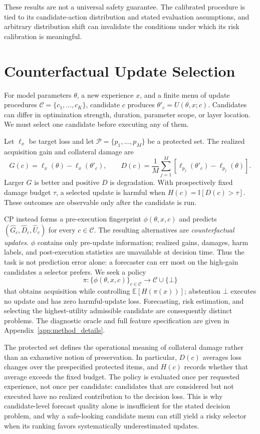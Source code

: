 \documentclass{article} %
\begin{document}
These results are not a universal safety guarantee. The calibrated procedure
is tied to its candidate-action distribution and stated evaluation
assumptions, and arbitrary distribution shift can invalidate the conditions
under which its risk calibration is meaningful.

\section{Counterfactual Update Selection}
\label{sec:problem}

For model parameters $\theta$, a new experience $x$, and a finite menu of
update procedures $\mathcal{C}=\{c_1,\ldots,c_K\}$, candidate $c$ produces
$\theta'_c=U(\theta,x;c)$. Candidates can differ in optimization strength,
duration, parameter scope, or layer location. We must select one candidate
before executing any of them.

Let $\ell_x$ be target loss and let $\mathcal P=\{p_1,\ldots,p_M\}$ be a
protected set. The realized acquisition gain and collateral damage are
\[
G(c)=\ell_x(\theta)-\ell_x(\theta'_c),\qquad
D(c)=\frac1M\sum_{j=1}^M[\ell_{p_j}(\theta'_c)-\ell_{p_j}(\theta)].
\]
Larger $G$ is better and positive $D$ is degradation. With prospectively fixed
damage budget $\tau$, a selected update is harmful when
$H(c)=\mathbb I[D(c)>\tau]$. These outcomes are observable only after the
candidate is run.

CP instead forms a pre-execution fingerprint $\phi(\theta,x,c)$ and predicts
$(\widehat G_c,\widehat D_c,\widehat U_c)$ for every $c\in\mathcal C$.
The resulting alternatives are \emph{counterfactual updates}. $\phi$ contains
only pre-update information; realized gains, damages, harm labels, and
post-execution statistics are unavailable at decision time. Thus the task is
not prediction error alone: a forecaster can err most on the high-gain
candidates a selector prefers. We seek a policy
\[
\pi:\{\phi(\theta,x,c)\}_{c\in\mathcal C}\to\mathcal C\cup\{\bot\}
\]
that obtains acquisition while controlling $\mathbb E[H(\pi(x))]$;
abstention $\bot$ executes no update and has zero harmful-update loss.
Forecasting, risk estimation, and selecting the highest-utility admissible
candidate are consequently distinct problems. The diagnostic oracle and full
feature specification are given in Appendix~\ref{app:method_details}.

The protected set defines the operational meaning of collateral damage rather
than an exhaustive notion of preservation. In particular, $D(c)$ averages loss
changes over the prespecified protected items, and $H(c)$ records whether that
average exceeds the fixed budget. The policy is evaluated once per requested
experience, not once per candidate: candidates that are considered but not
executed have no realized contribution to the decision loss. This is why
candidate-level forecast quality alone is insufficient for the stated
decision problem, and why a safe-looking candidate menu can still yield a
risky selector when its ranking favors systematically underestimated updates.
\end{document}
